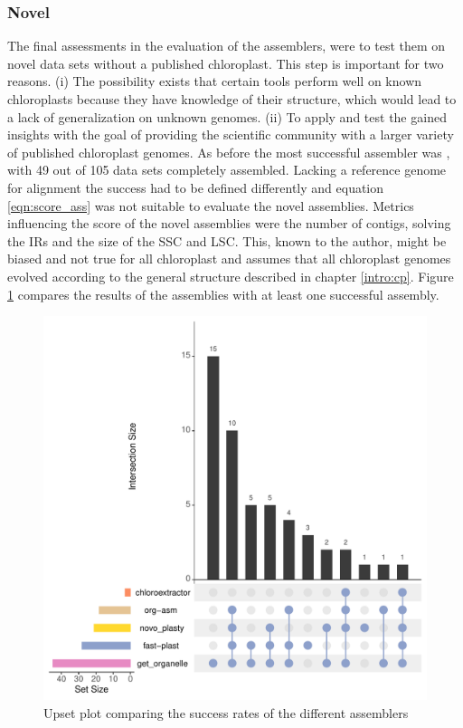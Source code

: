 \subsubsection{Novel}
 
The final assessments in the evaluation of the assemblers, were to test them on novel data sets without a
published chloroplast. This step is important for two reasons. (i) The possibility exists that certain tools
perform well on known chloroplasts because they have knowledge of their structure, which would lead to a lack
of generalization on unknown genomes.  (ii) To apply and test the gained insights with the goal of providing
the scientific community with a larger variety of published chloroplast genomes. As before the most successful
assembler was \go, with 49 out of 105 data sets completely assembled. \newline Lacking a reference genome for
alignment the success had to be defined differently and equation \ref{eqn:score_ass} was not suitable to
evaluate the novel assemblies. Metrics influencing the score of the novel assemblies were the number of
contigs, solving the IRs and the size of the SSC and LSC. This, known to the author, might be biased and not
true for all chloroplast and assumes that all chloroplast genomes evolved according to the general structure
described in chapter \ref{intro:cp}. Figure \ref{fig:upset_novel} compares the results of the assemblies with
at least one successful assembly.

\begin{figure}[H]
\centering
\includegraphics[height=.45\textheight, width=.95\textwidth]{Figures/upset_novel}
\decoRule
\caption[Upset plot comparing the success rates for novel data sets]{Upset plot comparing the success rates of the different assemblers}
\label{fig:upset_novel}
\end{figure}


